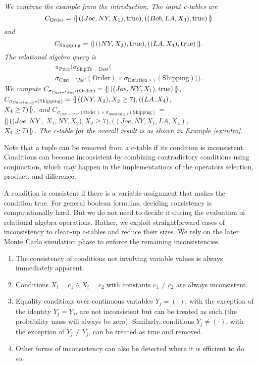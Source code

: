 \begin{example}\em
We continue the example from the introduction. The input c-tables are
\[
C_{\mathrm{Order}} = \{\!|\, ((Joe, NY, X_1), \mbox{true}),
((Bob, LA, X_3), \mbox{true}) \,|\!\}
\]
and
\[
C_{\mathrm{Shipping}} = \{\!|\, ((NY, X_2), \mbox{true}),
   ((LA, X_4), \mbox{true}) \,|\!\}.
\]
The relational algebra query is
\begin{multline*}
\pi_{\mathrm{Price}}(\sigma_{\mathrm{ShipTo} = \mathrm{Dest}}( \\
\sigma_{\mathrm{Cust}='Joe'}(\mathrm{Order}) \times
\sigma_{\mathrm{Duration} \ge 7}(\mathrm{Shipping}))).
\end{multline*}
%
We compute
$
C_{\sigma_{\mathrm{Cust}='Joe'}(\mathrm{Order})} = \{\!|\, ((Joe, NY, X_1), \mbox{true})
\,|\!\}
$,
$
C_{\sigma_{\mathrm{Duration} \ge 7}(\mathrm{Shipping})} =
\{\!|\, ((NY, X_2), X_2 \ge 7),
((LA, X_4)$, \\
$X_4 \ge 7) \,|\!\},
$
%
and
$C_{\sigma_{\mathrm{Cust}='Joe'}(\mathrm{Order}) \times
\sigma_{\mathrm{Duration} \ge 7}(\mathrm{Shipping})}$ = \\
$\{\!|\, ((Joe, NY$, $X_1, NY, X_2), X_2 \ge 7),
((Joe, NY, X_1, LA, X_4)$, \\
$X_4 \ge 7) \,|\!\}$.
%
The c-table for the overall result is as shown in Example \ref{ex:intro}. 
%
\punto
\end{example}


Note that  a tuple can be removed  from a c-table if  its condition is
inconsistent.   Conditions  can   become  inconsistent   by  combining
contradictory conditions  using conjunction,  which may happen  in the
implementations of the operators selection, product, and difference.

A condition is consistent if there is a variable assignment that makes
the condition true. For general boolean formulas, deciding consistency
is computationally  hard. But we do  not need to decide  it during the
evaluation of relational  algebra operations.  Rather, we exploit straightforward cases of inconsistency to clean-up c-tables and reduce their sizes.
We rely on the later 
Monte Carlo simulation phase to enforce the remaining inconsistencies.
%
\begin{enumerate}
\addtolength{\topsep}{-0.3ex}
\addtolength{\labelsep}{-0.3ex}
\addtolength{\itemsep}{-1ex}
\item The consistency of conditions not involving variable values is always immediately apparent.
\item Conditions $X_i = c_1 \land X_i = c_2$ with constants $c_1 \neq c_2$ are always inconsistent.
\item Equality conditions over continuous variables $Y_j = (\cdot)$, with the exception of the identity $Y_j = Y_j$, are not inconsistent but can be treated as such (the probability mass will always be zero).  Similarly, conditions $Y_j \neq (\cdot)$, with the exception of $Y_j \neq Y_j$, can be treated as true and removed.
\item Other forms of inconsistency can also be detected where it is efficient to do so.
\end{enumerate}

